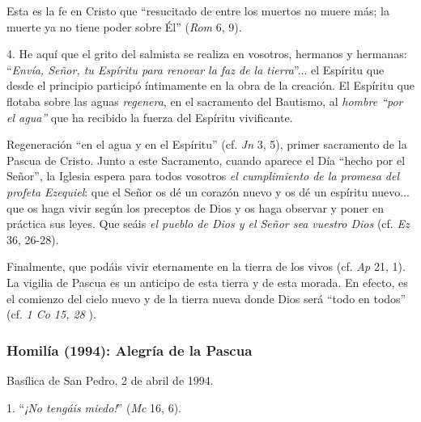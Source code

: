 			\begin{body}Esta es la fe en Cristo que “resucitado de entre los muertos no muere más; la muerte ya no tiene poder sobre Él” (\textit{Rom} 6, 9). \end{body}
			
			\begin{body}4. He aquí que el grito del salmista se realiza en vosotros, hermanos y hermanas: “\textit{Envía, Señor, tu Espíritu para renovar la faz de la tierra}”... el Espíritu que desde el principio participó íntimamente en la obra de la creación. El Espíritu que flotaba sobre las aguas \textit{regenera}, en el sacramento del Bautismo, al \textit{hombre “por el agua”} que ha recibido la fuerza del Espíritu vivificante. \end{body}
			
			\begin{body}Regeneración “en el agua y en el Espíritu” (cf. \textit{Jn} 3, 5), primer sacramento de la Pascua de Cristo. Junto a este Sacramento, cuando aparece el Día “hecho por el Señor”, la Iglesia espera para todos vosotros \textit{el cumplimiento de la promesa del profeta Ezequiel}: que el Señor os dé un corazón nuevo y os dé un espíritu nuevo... que os haga vivir según los preceptos de Dios y os haga observar y poner en práctica sus leyes. Que seáis \textit{el pueblo de Dios y el Señor sea vuestro Dios} (cf. \textit{Ez} 36, 26-28). \end{body}
			
			\begin{body}Finalmente, que podáis vivir eternamente en la tierra de los vivos (cf. \textit{Ap} 21, 1). La vigilia de Pascua es un anticipo de esta tierra y de esta morada. En efecto, es el comienzo del cielo nuevo y de la tierra nueva donde Dios será “todo en todos” (cf. \textit{1 Co 15, 28} ).\end{body}
			
			\subsubsection{Homilía (1994): Alegría de la Pascua}
			
			\begin{referencia}Basílica de San Pedro, 2 de abril de 1994.\end{referencia}
			
			\begin{body} 1. “\textit{¡No tengáis miedo!}” (\textit{Mc} 16, 6). \end{body}
			
